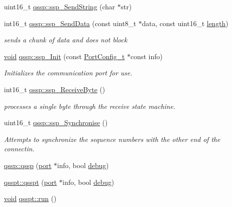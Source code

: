 \begin{DoxyCompactItemize}
uint16\-\_\-t \hyperlink{group___uploader_ga53a085c64c9a0e54a10cefe2ce660714}{qssp\-::ssp\-\_\-\-Send\-String} (char $\ast$str)
\item 
int16\-\_\-t \hyperlink{group___uploader_gae129d1cdf9ba386b6cd8002176a35a3b}{qssp\-::ssp\-\_\-\-Send\-Data} (const uint8\-\_\-t $\ast$data, const uint16\-\_\-t \hyperlink{uavobjecttemplate_8m_a076bf56c9bafa07f3dbda4901a40d84c}{length})
\begin{DoxyCompactList}\small\item\em sends a chunk of data and does not block \end{DoxyCompactList}\item 
\hyperlink{group___u_a_v_objects_plugin_ga444cf2ff3f0ecbe028adce838d373f5c}{void} \hyperlink{group___uploader_gaa7efad31d36502cca3aab3e4eed10d12}{qssp\-::ssp\-\_\-\-Init} (const \hyperlink{struct_port_config__t}{\-Port\-Config\-\_\-t} $\ast$const info)
\begin{DoxyCompactList}\small\item\em \-Initializes the communication port for use. \end{DoxyCompactList}\item 
int16\-\_\-t \hyperlink{group___uploader_gae06a33d9cc36f1b95bb0bc0a5ab8ca3a}{qssp\-::ssp\-\_\-\-Receive\-Byte} ()
\begin{DoxyCompactList}\small\item\em processes a single byte through the receive state machine. \end{DoxyCompactList}\item 
uint16\-\_\-t \hyperlink{group___uploader_ga6f47e7cf74215ceeaf3d6234ef0c37b7}{qssp\-::ssp\-\_\-\-Synchronise} ()
\begin{DoxyCompactList}\small\item\em \-Attempts to synchronize the sequence numbers with the other end of the connectin. \end{DoxyCompactList}\item 
\hyperlink{group___uploader_ga6b7f70326e497709fc513c3d122379cb}{qssp\-::qssp} (\hyperlink{classport}{port} $\ast$info, bool \hyperlink{synchronousprocess_8cpp_abed82baf7f470b522273a3e37c24c600a5be0fd270d9cbf6a0b7445db855089da}{debug})
\item 
\hyperlink{group___uploader_gaa7e3f69818d5f701e1c7191059b332ae}{qsspt\-::qsspt} (\hyperlink{classport}{port} $\ast$info, bool \hyperlink{synchronousprocess_8cpp_abed82baf7f470b522273a3e37c24c600a5be0fd270d9cbf6a0b7445db855089da}{debug})
\item 
\hyperlink{group___u_a_v_objects_plugin_ga444cf2ff3f0ecbe028adce838d373f5c}{void} \hyperlink{group___uploader_gac7b338eecc56ca930c6078162b168c83}{qsspt\-::run} ()

\end{DoxyCompactItemize}

